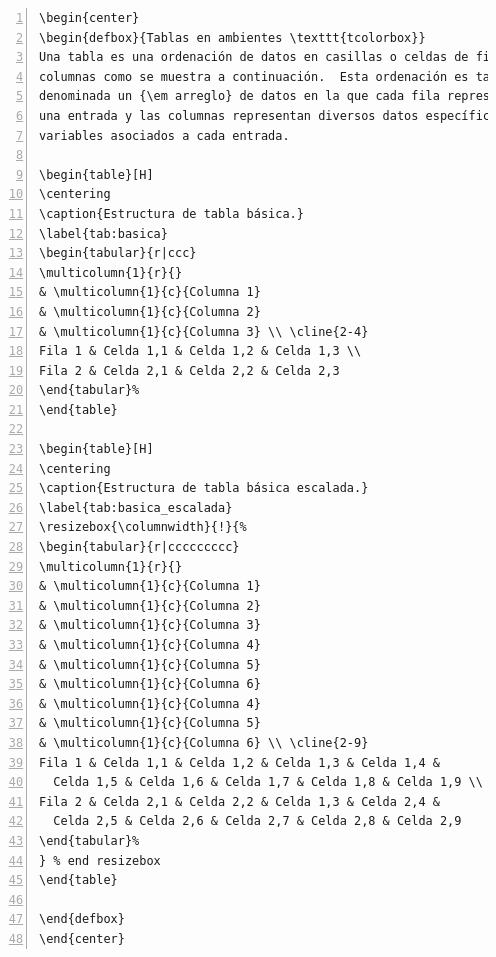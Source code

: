 \documentclass[11pt,letterpaper,twoside]{report}%
\begin{document}
\begin{Verbatim}[frame=single,framesep=5mm,rulecolor=\color{gray},numbers=left,numbersep=-10pt]
\begin{center}
\begin{defbox}{Tablas en ambientes \texttt{tcolorbox}}
Una tabla es una ordenación de datos en casillas o celdas de filas y 
columnas como se muestra a continuación.  Esta ordenación es también 
denominada un {\em arreglo} de datos en la que cada fila representa 
una entrada y las columnas representan diversos datos específicos o 
variables asociados a cada entrada.

\begin{table}[H]
\centering
\caption{Estructura de tabla básica.}
\label{tab:basica}
\begin{tabular}{r|ccc}
\multicolumn{1}{r}{}
& \multicolumn{1}{c}{Columna 1}
& \multicolumn{1}{c}{Columna 2}
& \multicolumn{1}{c}{Columna 3} \\ \cline{2-4}
Fila 1 & Celda 1,1 & Celda 1,2 & Celda 1,3 \\
Fila 2 & Celda 2,1 & Celda 2,2 & Celda 2,3
\end{tabular}%
\end{table}

\begin{table}[H]
\centering
\caption{Estructura de tabla básica escalada.}
\label{tab:basica_escalada}
\resizebox{\columnwidth}{!}{%
\begin{tabular}{r|ccccccccc}
\multicolumn{1}{r}{}
& \multicolumn{1}{c}{Columna 1}
& \multicolumn{1}{c}{Columna 2}
& \multicolumn{1}{c}{Columna 3}
& \multicolumn{1}{c}{Columna 4}
& \multicolumn{1}{c}{Columna 5}
& \multicolumn{1}{c}{Columna 6}
& \multicolumn{1}{c}{Columna 4}
& \multicolumn{1}{c}{Columna 5}
& \multicolumn{1}{c}{Columna 6} \\ \cline{2-9}
Fila 1 & Celda 1,1 & Celda 1,2 & Celda 1,3 & Celda 1,4 & 
  Celda 1,5 & Celda 1,6 & Celda 1,7 & Celda 1,8 & Celda 1,9 \\
Fila 2 & Celda 2,1 & Celda 2,2 & Celda 1,3 & Celda 2,4 &
  Celda 2,5 & Celda 2,6 & Celda 2,7 & Celda 2,8 & Celda 2,9
\end{tabular}%
} % end resizebox
\end{table}

\end{defbox}
\end{center}
\end{Verbatim}
\end{document}
